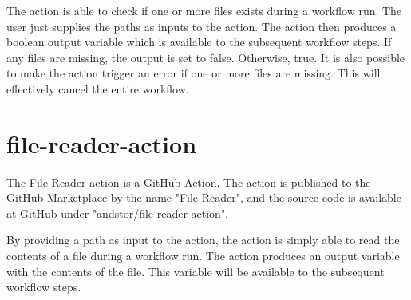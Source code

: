 The action is able to check if one or more files exists during a workflow run. The user just supplies the paths as inputs to the action. The action then produces a boolean output variable which is available to the subsequent workflow steps. If any files are missing, the output is set to false. Otherwise, true. It is also possible to make the action trigger an error if one or more files are missing. This will effectively cancel the entire workflow.

\section{file-reader-action}
The File Reader action is a GitHub Action. The action is published to the GitHub Marketplace by the name "File Reader", and the source code is available at GitHub under "andstor/file-reader-action".

By providing a path as input to the action, the action is simply able to read the contents of a file during a workflow run. The action produces an output variable with the contents of the file. This variable will be available to the subsequent workflow steps.

